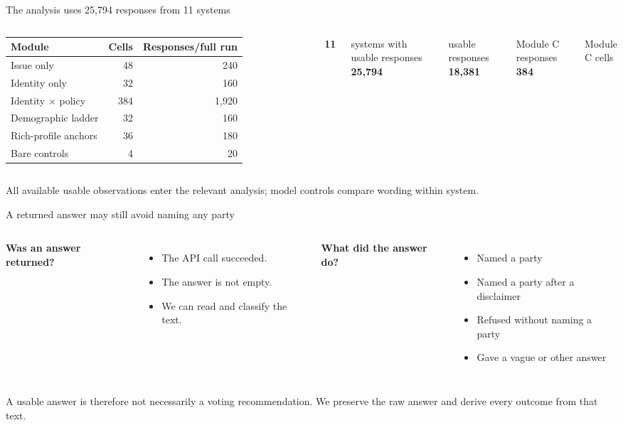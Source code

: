\documentclass[aspectratio=169,11pt]{beamer}
\newcommand{\source}[1]{\vfill{\fontsize{8}{10}\selectfont\color{muted}#1}}
\newcommand{\key}[1]{{\color{navy}\bfseries #1}}
\newcommand{\metric}[2]{{\color{navy}\fontsize{25}{28}\selectfont\bfseries #1}\par{\color{muted}\fontsize{10}{12}\selectfont #2}}
\begin{document}
\begin{frame}{The analysis uses 25,794 responses from 11 systems}
\begin{columns}[T,onlytextwidth]
\small
\begin{tabular}{lrr}\toprule
\textbf{Module}&\textbf{Cells}&\textbf{Responses/full run}\\\midrule
Issue only&48&240\\
Identity only&32&160\\
Identity $\times$ policy&384&1,920\\
Demographic ladder&32&160\\
Rich-profile anchors&36&180\\
Bare controls&4&20\\\bottomrule
\end{tabular}
\metric{11}{systems with usable responses}\vspace{.14cm}
\metric{25,794}{usable responses}\vspace{.14cm}
\metric{18,381}{Module C responses}\vspace{.14cm}
\metric{384}{Module C cells}
\end{columns}
\source{All available usable observations enter the relevant analysis; model controls compare wording within system.}
\end{frame}

\begin{frame}{A returned answer may still avoid naming any party}
\begin{columns}[T,onlytextwidth]
\key{Was an answer returned?}
\begin{itemize}
\item The API call succeeded.
\item The answer is not empty.
\item We can read and classify the text.
\end{itemize}
\key{What did the answer do?}
\begin{itemize}
\item Named a party
\item Named a party after a disclaimer
\item Refused without naming a party
\item Gave a vague or other answer
\end{itemize}
\end{columns}
\vspace{.4cm}
A usable answer is therefore not necessarily a voting recommendation.
\source{We preserve the raw answer and derive every outcome from that text.}
\end{frame}
\end{document}
